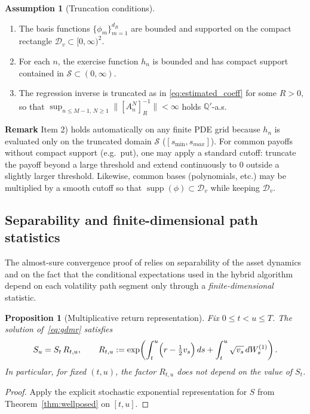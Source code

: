 \documentclass[10pt]{article}
\theoremstyle{plain}
\newtheorem{proposition}[theorem]{Proposition}
\theoremstyle{definition}
\newtheorem{assumption}[theorem]{Assumption}
\theoremstyle{remark}
\newcommand{\supp}{\operatorname{supp}}
\begin{document}
\begin{assumption}[Truncation conditions]
\label{ass:truncation}
\begin{enumerate}
\item The basis functions $\{\phi_m\}_{m=1}^{d_B}$ are bounded and supported on the compact rectangle
$\mathcal{D}_v\subset [0,\infty)^2$.
\item For each $n$, the exercise function $h_n$ is bounded and has compact support contained in $\mathcal{S}\subset(0,\infty)$.
\item The regression inverse is truncated as in \eqref{eq:estimated_coeff} for some $R>0$, so that
$\sup_{n\le M-1,\,N\ge 1}\|[A_n^N]^{-1}_R\| <\infty$ holds $\mathbb{Q}'$-a.s.
\end{enumerate}
\end{assumption}

\noindent\textbf{Remark}
Item 2) holds automatically on any finite PDE grid because $h_n$ is evaluated only on the truncated domain
$\mathcal{S}$ ($[s_{\min},s_{max}]$). For common payoffs without compact support (e.g.\ put), one may apply a standard cutoff:
truncate the payoff beyond a large threshold and extend continuously to $0$ outside a slightly larger threshold. Likewise, common bases (polynomials,
etc.) may be multiplied by a smooth cutoff so that $\supp(\phi)\subset\mathcal{D}_v$ while keeping $\mathcal{D}_v$.

\subsection{Separability and finite-dimensional path statistics}
\label{subsec:separability}

The almost-sure convergence proof of \citet{farahany2020mixing} relies on separability of the asset dynamics and on the
fact that the conditional expectations used in the hybrid algorithm depend on each volatility path segment only
through a \emph{finite-dimensional} statistic.

\begin{proposition}[Multiplicative return representation]
\label{prop:multiplicative_return}
Fix $0\le t<u\le T$. The solution of~\eqref{eq:gdmr} satisfies
\[
S_u = S_t\,R_{t,u},
\qquad
R_{t,u} := \exp\!\left(\int_t^u\Bigl(r-\tfrac12 v_s\Bigr)\,ds + \int_t^u \sqrt{v_s}\,dW^{(1)}_s\right).
\]
In particular, for fixed $(t,u)$, the factor $R_{t,u}$ does not depend on the value of $S_t$.
\end{proposition}

\begin{proof}
Apply the explicit stochastic exponential representation for $S$ from Theorem~\ref{thm:wellposed} on $[t,u]$.
\end{proof}
\end{document}

